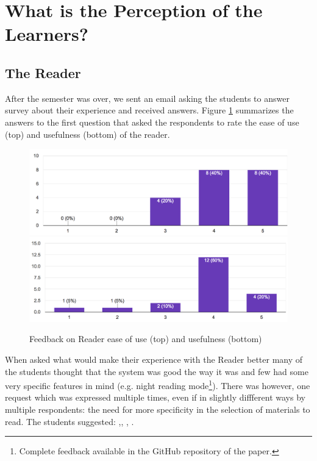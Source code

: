 
\newpage
\section{What is the Perception of the Learners?}
\label{sec:perception}

\subsection{The Reader}

After the semester was over, we sent an email asking the students to answer survey about their experience and received \surveyrespondents answers. Figure \ref{fig:reader_use} summarizes the answers to the first question that asked the respondents to rate the ease of use (top) and usefulness (bottom) of the reader. 

 \begin{figure}[h!]
    \centering
      \includegraphics[width=0.7\columnwidth]{figures/opinions/reader_ease_of_use}
      \includegraphics[width=0.7\columnwidth]{figures/opinions/reader_usefulness}
      \caption{Feedback on Reader ease of use (top) and usefulness (bottom)}
      \label{fig:reader_use}
    \end{figure}

When asked what would make their experience with the Reader better many of the students thought that the system was good the way it was and few had some very specific features in mind (e.g. night reading mode\footnote{Complete feedback available in the GitHub repository of the paper.}). There was however, one request which was expressed multiple times, even if in slightly diffferent ways by multiple respondents: the need for more specificity in the selection of materials to read. The students suggested: ,, , . 

